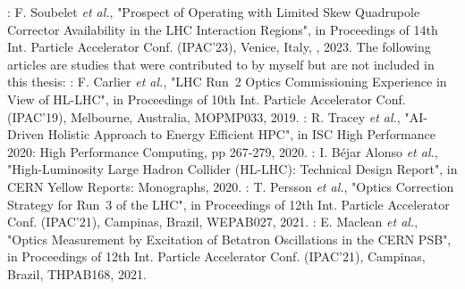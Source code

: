 \begin{declaration}
\noindent{}: F. Soubelet \textit{et al.}, "Prospect of Operating with Limited Skew Quadrupole Corrector Availability in the LHC Interaction Regions", in Proceedings of \num{14}th Int. Particle Accelerator Conf. (IPAC'23), Venice, Italy, , \num{2023}.
\newline
\newline
\indent
The following articles are studies that were contributed to by myself but are not included in this thesis:
\newline \newline
\noindent\cite{IPAC:Tomas:Run2_Experience_View_LHC_HLLHC}: F. Carlier \textit{et al.}, "LHC Run~\num{2} Optics Commissioning Experience in View of HL-LHC", in Proceedings of \num{10}th Int. Particle Accelerator Conf. (IPAC'19), Melbourne, Australia, MOPMP033, \num{2019}.
\newline \newline
\noindent\cite{HPC:Tracey:AI_Holistic}: R. Tracey \textit{et al.}, "AI-Driven Holistic Approach to Energy Efficient HPC", in ISC High Performance \num{2020}: High Performance Computing, pp \num{267}-\num{279}, \num{2020}.
\newline \newline
\noindent\cite{REPORT:Apollinari:HL_LHC_TDR}: I. Béjar Alonso \textit{et al.}, "High-Luminosity Large Hadron Collider (HL-LHC): Technical Design Report", in CERN Yellow Reports: Monographs, \num{2020}.
\newline \newline
\noindent\cite{IPAC:Persson:Optics_Correction_Strategy_2021}: T. Persson \textit{et al.}, "Optics Correction Strategy for Run~\num{3} of the LHC", in Proceedings of \num{12}th Int. Particle Accelerator Conf. (IPAC'21), Campinas, Brazil, WEPAB027, \num{2021}.
\newline \newline
\noindent\cite{IPAC:Maclean:Optics_Measurement_Excitation_Betatron_Oscillations_PSB}: E. Maclean \textit{et al.}, "Optics Measurement by Excitation of Betatron Oscillations in the CERN PSB", in Proceedings of \num{12}th Int. Particle Accelerator Conf. (IPAC'21), Campinas, Brazil, THPAB168, \num{2021}.

\end{declaration}
